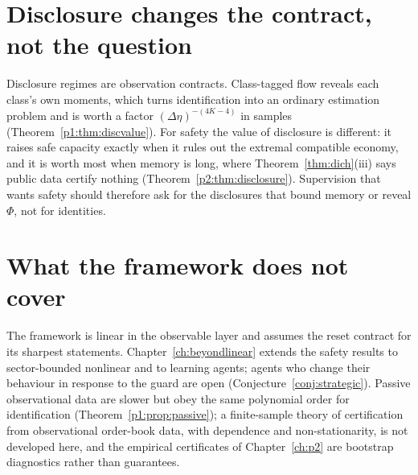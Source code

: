 \section{Disclosure changes the contract, not the question}\label{sec:fw_disclosure}

Disclosure regimes are observation contracts. Class-tagged flow reveals each class's own moments, which turns identification into an ordinary estimation problem and is worth a factor $(\Delta\eta)^{-(4K-4)}$ in samples (Theorem~\ref{p1:thm:discvalue}). For safety the value of disclosure is different: it raises safe capacity exactly when it rules out the extremal compatible economy, and it is worth most when memory is long, where Theorem~\ref{thm:dich}(iii) says public data certify nothing (Theorem~\ref{p2:thm:disclosure}). Supervision that wants safety should therefore ask for the disclosures that bound memory or reveal $\Phi$, not for identities.

\section{What the framework does not cover}\label{sec:fw_scope}

The framework is linear in the observable layer and assumes the reset contract for its sharpest statements. Chapter~\ref{ch:beyondlinear} extends the safety results to sector-bounded nonlinear and to learning agents; agents who change their behaviour in response to the guard are open (Conjecture~\ref{conj:strategic}). Passive observational data are slower but obey the same polynomial order for identification (Theorem~\ref{p1:prop:passive}); a finite-sample theory of certification from observational order-book data, with dependence and non-stationarity, is not developed here, and the empirical certificates of Chapter~\ref{ch:p2} are bootstrap diagnostics rather than guarantees.

